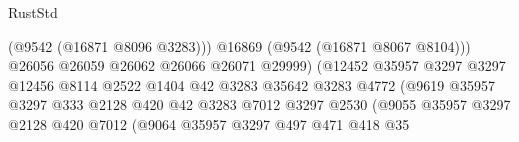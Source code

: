 \begin{lexlean}{RustStd}
\begin{coremodule}
                                                    (@9542 (@16871 @8096 @3283)))
                                                  @16869
                                                  (@9542 (@16871 @8067 @8104)))
                                                @26056
                                                @26059
                                                @26062
                                                @26066
                                                @26071
                                                @29999)
                                              (@12452
                                                @35957
                                                @3297
                                                @3297
                                                @12456
                                                @8114
                                                @2522
                                                @1404
                                                @42
                                                @3283
                                                @35642
                                                @3283
                                                @4772
                                                (@9619
                                                  @35957
                                                  @3297
                                                  @333
                                                  @2128
                                                  @420
                                                  @42
                                                  @3283
                                                  @7012
                                                  @3297
                                                  @2530
                                                  (@9055
                                                    @35957
                                                    @3297
                                                    @2128
                                                    @420
                                                    @7012
                                                    (@9064
                                                      @35957
                                                      @3297
                                                      @497
                                                      @471
                                                      @418
                                                      @35

\end{coremodule}
\end{lexlean}
